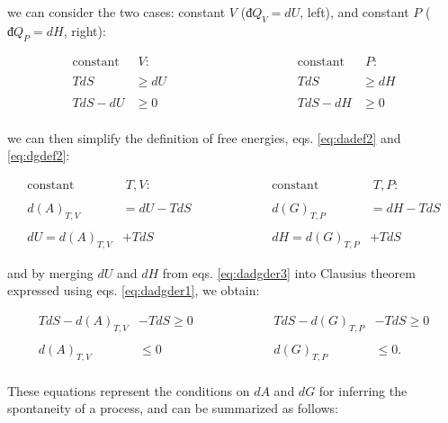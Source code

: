 \documentclass[
  9pt,
]{extbook}
\theoremstyle{definition}
\theoremstyle{definition}
\theoremstyle{definition}
\theoremstyle{remark}
\begin{document}
we can consider the two cases: constant \(V\) (\(đQ_V=dU\), left), and constant \(P\) (\(đQ_P=dH\), right):

\begin{equation}
\begin{aligned}
\text{constant} & \; V:           & \qquad \qquad & \qquad \qquad &     \text{constant} & \; P: \\
\\
TdS & \geq dU           & &   &     TdS & \geq dH \\
\\
TdS -dU & \geq 0         & &   &      TdS -dH & \geq 0 \\
\end{aligned}
\label{eq:dadgder1}
\end{equation}

we can then simplify the definition of free energies, eqs. \eqref{eq:dadef2} and \eqref{eq:dgdef2}:

\begin{equation}
\begin{aligned}
\text{constant} & \; T,V:           & \qquad & \qquad &     \text{constant} & \; T,P: \\
\\
d(A)_{T,V} &= dU -TdS     & &   &       d(G)_{T,P} &= dH - TdS \\ 
\\
dU = d(A)_{T,V} &+TdS       & &   &       dH = d(G)_{T,P} &+TdS
\end{aligned}
\label{eq:dadgder3}
\end{equation}

and by merging \(dU\) and \(dH\) from eqs. \eqref{eq:dadgder3} into Clausius theorem expressed using eqs. \eqref{eq:dadgder1}, we obtain:

\begin{equation}
\begin{aligned}
TdS -d(A)_{T,V} &- TdS \geq 0 & \qquad & \qquad & TdS -d(G)_{T,P} &- TdS \geq 0 \\
\\
d(A)_{T,V} & \leq 0 & \qquad & \qquad & d(G)_{T,P} & \leq 0. \\
\end{aligned}
\label{eq:dadgcond}
\end{equation}

These equations represent the conditions on \(dA\) and \(dG\) for inferring the spontaneity of a process, and can be summarized as follows:
\end{document}

